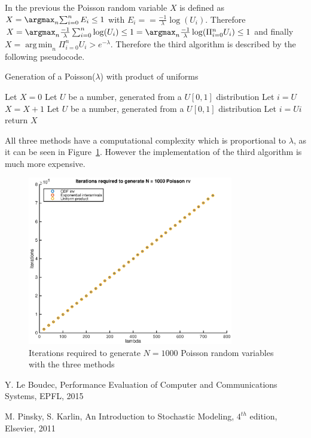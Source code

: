 \documentclass[10pt]{article}
\DeclareMathOperator*{\argmin}{arg\,min}
\begin{document}
In the previous the Poisson random variable $X$ is defined as $X = \argmax_n{\sum_{i = 0}^n E_i \le 1}$ with $E_i = = \frac{-1}{\lambda} \log(U_i)$. Therefore $X = \argmax_n{\frac{-1}{\lambda} \sum_{i = 0}^n \log(U_i) \le 1} = \argmax_n{\frac{-1}{\lambda} \log( \Pi_{i = 0}^n U_i ) \le 1}$ and finally $X = \argmin_n \Pi_{i = 0}^n U_i > e^{-\lambda}$. Therefore the third algorithm is described by the following pseudocode.

\begin{algorithm}
  \caption{Generation of a Poisson($\lambda$) with product of uniforms}\label{prod}
  \begin{algorithmic}[1]
    \Procedure{}{}
    \State Let $X = 0$
    \State Let $U$ be a number, generated from a $U[0,1]$ distribution
    \State Let $i = U$
    \State $X = X + 1$
    \State Let $U$ be a number, generated from a $U[0,1]$ distribution
    \State Let $i = Ui$
    \EndWhile
    \State return $X$
    \EndProcedure
  \end{algorithmic}
\end{algorithm}

All three methods have a computational complexity which is proportional to $\lambda$, as it can be seen in Figure~\ref{fig:poi_iter}. However the implementation of the third algorithm is much more expensive.

\begin{figure}[h]
  \centering
  \includegraphics[width = 0.8\textwidth]{images/poi_iter}
  \caption{Iterations required to generate $N = 1000$ Poisson random variables with the three methods}
  \label{fig:poi_iter}
\end{figure}

\begin{thebibliography}{10}

Y. Le Boudec, Performance Evaluation of Computer and Communications Systems, EPFL, 2015

M. Pinsky, S. Karlin, An Introduction to Stochastic Modeling, $4^{th}$ edition, Elsevier, 2011


\end{thebibliography}
\end{document}
